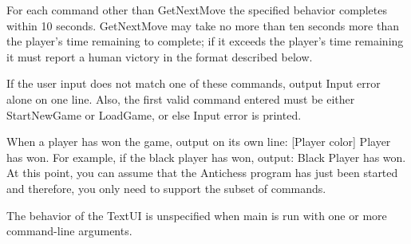 		
		For each command other than GetNextMove the specified behavior completes within 10 seconds. 
		GetNextMove may take no more than ten seconds more than the player's time remaining to 
		complete; if it exceeds the player's time remaining it must report a human victory in the 
		format described below.

		If the user input does not match one of these commands, output Input 
		error alone on one line. Also, the first valid command entered must 
		be either StartNewGame or LoadGame, or else Input error is printed.

		When a player has won the game, output on its own line: [Player color] Player has won. For 
		example, if the black player has won, output: Black Player has won. At this point, you can
		 assume that the Antichess program has just been started and therefore, you only need to 
		support the subset of commands.

		The behavior of the TextUI is unspecified when main is run with one or more command-line arguments.
		
